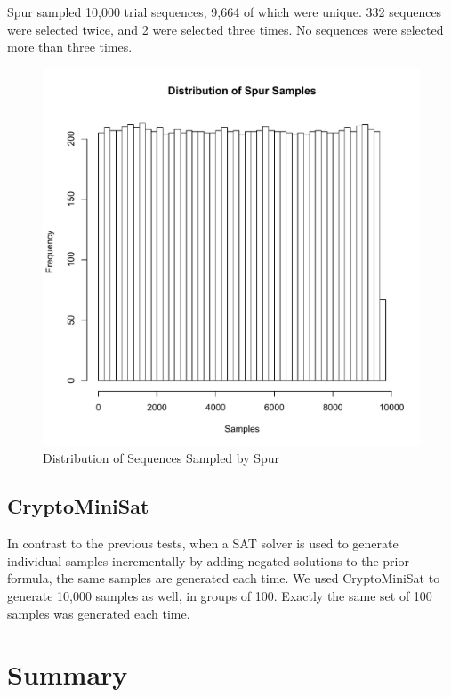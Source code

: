 Spur sampled 10,000 trial sequences, 9,664 of which were unique. 332 sequences were selected twice, and 2 were selected three times. No sequences were selected more than three times.

\begin{figure}[t]
\centering
\centerline{\includegraphics[origin=c,width=12cm]{../figures/spur-samples.pdf}}
\caption{Distribution of Sequences Sampled by Spur}
\label{fig:spur_samples}
\end{figure}


\subsection{CryptoMiniSat}

In contrast to the previous tests, when a SAT solver is used to generate individual samples incrementally by adding negated solutions to the prior formula, the same samples are generated each time. We used CryptoMiniSat to generate 10,000 samples as well, in groups of 100. Exactly the same set of 100 samples was generated each time.


\section{Summary}

